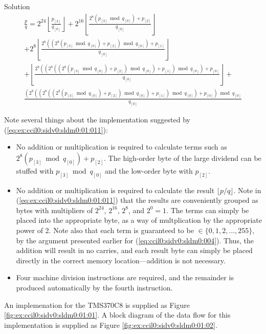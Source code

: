 \begin{vworkexampleparsection}{Solution}
\begin{eqnarray}
\nonumber & \displaystyle \frac{p}{q} =  2^{24} \left\lfloor{\frac{p_{[3]}}{q_{[0]}}}\right\rfloor
+
2^{16} \left\lfloor{\frac{2^8 (p_{[3]} \bmod q_{[0]}) + p_{[2]}}{q_{[0]}}}\right\rfloor & \\
\label{eq:ex:ccil0:sidv0:sldm0:01:011}
 & \displaystyle + 
2^{8} \left\lfloor{\frac{2^8((2^8 (p_{[3]} \bmod q_{[0]}) + p_{[2]}) \bmod q_{[0]}) + p_{[1]}}{q_{[0]}}}\right\rfloor & \\
\nonumber & \displaystyle + 
\left\lfloor{\frac{2^8((2^8((2^8 (p_{[3]} \bmod q_{[0]}) + p_{[2]}) \bmod q_{[0]}) + p_{[1]}) \bmod q_{[0]}) + p_{[0]}}{q_{[0]}}}\right\rfloor + & \\
\nonumber 
& \displaystyle \frac{(2^8((2^8((2^8 (p_{[3]} \bmod q_{[0]}) + p_{[2]}) \bmod q_{[0]}) + p_{[1]}) \bmod q_{[0]}) + p_{[0]}) \bmod q_{[0]}}{q_{[0]}}
&
\end{eqnarray}

Note several things about the implementation suggested by 
(\ref{eq:ex:ccil0:sidv0:sldm0:01:011}):

\begin{itemize}
\item No addition or multiplication is required to calculate terms such as
      $2^8 (p_{[3]} \bmod q_{[0]}) + p_{[2]}$.  The high-order byte of the
      large dividend can be stuffed with $p_{[3]} \bmod q_{[0]}$ and
      the low-order byte with $p_{[2]}$.
\item No addition or multiplication is required to calculate the 
      result $\lfloor p/q \rfloor$.
      Note in (\ref{eq:ex:ccil0:sidv0:sldm0:01:011}) that the results are
      conveniently grouped as bytes with multipliers of $2^{24}$, 
      $2^{16}$, $2^8$, and $2^0=1$.  The terms can simply be placed into
      the appropriate byte, as a way of multplication by the appropriate
      power of 2.  Note also that each term is guaranteed to be
      $\in \{0, 1, 2, \ldots{} , 255\}$, by the argument presented
      earlier for (\ref{eq:ccil0:sidv0:sldm0:004}).  Thus, the
      addition will result in no carries, and each result byte can simply
      be placed directly in the correct memory location---addition is
      not necessary.
\item Four machine division instructions are required, and the remainder
      is produced automatically by the fourth instruction.
\end{itemize}

An implemenation for the TMS370C8 is supplied as Figure
\ref{fig:ex:ccil0:sidv0:sldm0:01:01}.  A block diagram of the data
flow for this implementation is supplied as 
Figure \ref{fig:ex:ccil0:sidv0:sldm0:01:02}.
\end{vworkexampleparsection}
\vworkexamplefooter{}

